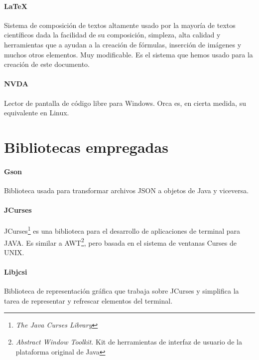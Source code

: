 \paragraph{\LaTeX} Sistema de composición de textos altamente usado por la mayoría de textos científicos dada la facilidad de su composición, simpleza, alta calidad y herramientas que a ayudan a la creación de fórmulas, inserción de imágenes y muchos otros elementos. Muy modificable. Es el sistema que hemos usado para la creación de este documento.

\paragraph{NVDA} Lector de pantalla de código libre para Windows. Orca es, en cierta medida, su equivalente en Linux.

\section{Bibliotecas empregadas}

\paragraph{Gson} Biblioteca usada para transformar archivos JSON a objetos de Java y viceversa.

\paragraph{JCurses} JCurses\footnote{\textit{The Java Curses Library}} es una biblioteca para el desarrollo de aplicaciones de terminal para JAVA. Es similar a AWT\footnote{\textit{Abstract Window Toolkit.} Kit de herramientas de interfaz de usuario de la plataforma original de Java}, pero basada en el sistema de ventanas Curses de UNIX.

\paragraph{Libjcsi} Biblioteca de representación gráfica que trabaja sobre JCurses y simplifica la tarea de representar y refrescar elementos del terminal.
